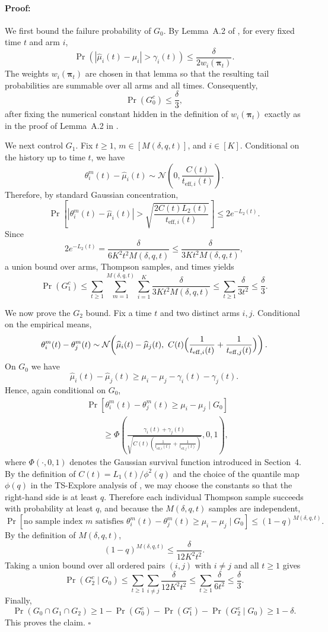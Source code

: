 \documentclass{article}
\newenvironment{proof}{\paragraph{Proof:}}{\hfill$\square$}
\begin{document}
\begin{proof}
We first bound the failure probability of $G_0$. By Lemma~A.2 of \citet{thaker2022maximizing}, for every fixed time $t$ and arm $i$,
\[
\Pr\!\left(
|\widehat\mu_i(t)-\mu_i|>\gamma_i(t)
\right)
\le
\frac{\delta}{2w_i(\boldsymbol\pi_t)}.
\]
The weights $w_i(\boldsymbol\pi_t)$ are chosen in that lemma so that the resulting tail probabilities are summable over all arms and all times. Consequently,
\[
\Pr(G_0^c)\le \frac{\delta}{3},
\]
after fixing the numerical constant hidden in the definition of $w_i(\boldsymbol\pi_t)$ exactly as in the proof of Lemma~A.2 in \citet{thaker2022maximizing}.

We next control $G_1$. Fix $t\ge 1$, $m\in[M(\delta,q,t)]$, and $i\in[K]$. Conditional on the history up to time $t$, we have
\[
\theta_i^m(t)-\widehat\mu_i(t)
\sim
\mathcal N\!\left(0,\frac{C(t)}{t_{\mathrm{eff},i}(t)}\right).
\]
Therefore, by standard Gaussian concentration,
\[
\Pr\!\left[
|\theta_i^m(t)-\widehat\mu_i(t)|>
\sqrt{\frac{2C(t)L_2(t)}{t_{\mathrm{eff},i}(t)}}
\right]
\le 2e^{-L_2(t)}.
\]
Since
\[
2e^{-L_2(t)}
=
\frac{\delta}{6K^2t^2M(\delta,q,t)}
\le
\frac{\delta}{3Kt^2M(\delta,q,t)},
\]
a union bound over arms, Thompson samples, and times yields
\[
\Pr(G_1^c)
\le
\sum_{t\ge 1}\sum_{m=1}^{M(\delta,q,t)}\sum_{i=1}^K
\frac{\delta}{3Kt^2M(\delta,q,t)}
\le
\sum_{t\ge 1}\frac{\delta}{3t^2}
\le
\frac{\delta}{3}.
\]

We now prove the $G_2$ bound. Fix a time $t$ and two distinct arms $i,j$. Conditional on the empirical means,
\[
\theta_i^m(t)-\theta_j^m(t)
\sim
\mathcal N\!\left(
\widehat\mu_i(t)-\widehat\mu_j(t),
\ C(t)\Bigl(\frac{1}{t_{\mathrm{eff},i}(t)}+\frac{1}{t_{\mathrm{eff},j}(t)}\Bigr)
\right).
\]
On $G_0$ we have
\[
\widehat\mu_i(t)-\widehat\mu_j(t)
\ge
\mu_i-\mu_j-\gamma_i(t)-\gamma_j(t).
\]
Hence, again conditional on $G_0$,
\begin{align*}
&\Pr\!\left[
\theta_i^m(t)-\theta_j^m(t)\ge \mu_i-\mu_j
\mid G_0
\right]\\
&\qquad\ge
\Phi\!\left(
\frac{\gamma_i(t)+\gamma_j(t)}{\sqrt{C(t)\left(\frac1{t_{\mathrm{eff},i}(t)}+\frac1{t_{\mathrm{eff},j}(t)}\right)}},
0,1
\right),
\end{align*}
where $\Phi(\cdot,0,1)$ denotes the Gaussian survival function introduced in Section~4. By the definition of $C(t)=L_1(t)/\phi^2(q)$ and the choice of the quantile map $\phi(q)$ in the TS-Explore analysis of \citet{wang2022thompson}, we may choose the constants so that the right-hand side is at least $q$. Therefore each individual Thompson sample succeeds with probability at least $q$, and because the $M(\delta,q,t)$ samples are independent,
\[
\Pr\!\left[
\text{no sample index }m\text{ satisfies }
\theta_i^m(t)-\theta_j^m(t)\ge \mu_i-\mu_j
\mid G_0
\right]
\le
(1-q)^{M(\delta,q,t)}.
\]
By the definition of $M(\delta,q,t)$,
\[
(1-q)^{M(\delta,q,t)}
\le
\frac{\delta}{12K^2t^2}.
\]
Taking a union bound over all ordered pairs $(i,j)$ with $i\neq j$ and all $t\ge 1$ gives
\[
\Pr(G_2^c\mid G_0)
\le
\sum_{t\ge 1}\sum_{i\neq j}\frac{\delta}{12K^2t^2}
\le
\sum_{t\ge 1}\frac{\delta}{6t^2}
\le
\frac{\delta}{3}.
\]
Finally,
\[
\Pr(G_0\cap G_1\cap G_2)
\ge
1-\Pr(G_0^c)-\Pr(G_1^c)-\Pr(G_2^c\mid G_0)
\ge 1-\delta.
\]
This proves the claim.
\end{proof}
\end{document}
